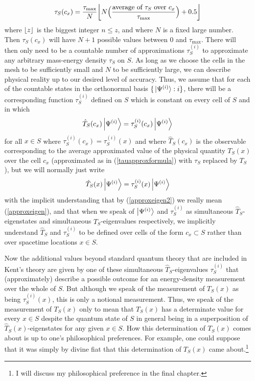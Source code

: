     \begin{equation}\label{tauapproxformula}
    \tau_S(c_x)=\frac{\tau_{\text{max}}}{N}\floor*{N\Big(\frac{\text{average of }\tau_S\text{ over }c_x}{\tau_{\text{max}}}\Big)+0.5}
    \end{equation}
    where $\floor*{z}$ is the biggest integer $n\leq z$, and where $N$ is a fixed large number. Then $\tau_S(c_x)$ will have $N+1$ possible values between $0$ and $\tau_{\text{max}}$.  There will then only need to be a countable number of approximations $\tau_S^{(i)}$ to approximate any arbitrary mass-energy density $\tau_S$ on $S$.  As long as we choose the cells in the mesh to be sufficiently small and $N$ to be sufficiently large, we can describe physical reality up to our desired level of accuracy. Thus, we assume that for each of the countable states in the orthonormal basis $\{\ket*{\Psi^{(i)}}:i\}$, there will be a corresponding function $\tau_S^{(i)}$ defined on $S$ which is constant on every cell of $S$ and in which 
\begin{equation}\label{approxeigen}
\hat{T}_S(c_x)\ket{\Psi^{(i)}}= \tau_S^{(i)}(c_x)\ket{\Psi^{(i)}}
\end{equation} 
for all $x\in S$ where $ \tau_S^{(i)}(c_x)= \tau_S^{(i)}(x)$ and where $\hat{T}_S(c_x)$ is the observable corresponding to the average approximated value of the physical quantity $T_S(x)$ over the cell $c_x$ (approximated as in (\ref{tauapproxformula}) with $\tau_S$ replaced by $T_S$), but we will normally just write
\begin{equation}\label{approxeigen2}
  \hat{T}_S(x)\ket{\Psi^{(i)}}= \tau_S^{(i)}(x)\ket{\Psi^{(i)}}
  \end{equation}
with the implicit understanding that by (\ref{approxeigen2}) we really mean (\ref{approxeigen}), and that when we speak of $\ket{\Psi^{(i)}}$ and $\tau_S^{(i)}$ as simultaneous $\hat{T}_S$-eigenstates and simultaneous $\hat{T}_S$-eigenvalues respectively, we implicitly understand $\hat{T}_S$ and $\tau_S^{(i)}$ to be defined over cells of the form $c_x\subset S$ rather than over spacetime locations $x\in S$.

Now the additional values beyond standard quantum theory that are included in Kent's theory are given by one of these simultaneous $\hat{T}_S$-eigenvalues $\tau_S^{(i)}$ that (approximately) describe a possible outcome for an energy-density measurement over the whole of $S$.  But although we speak of the measurement of $T_S(x)$ as being $\tau_S^{(i)}(x)$, this is only a notional measurement. Thus, we speak of the measurement of  $T_S(x)$ only to mean that $T_S(x)$ has a determinate value for every $x\in S$ despite the quantum state of $S$ in general being in a superposition of $\hat{T}_S(x)$-eigenstates for any given $x\in S$. How this determination of $T_S(x)$ comes about is up to one's philosophical preferences. For example, one could suppose that it was simply by divine fiat that this determination  of $T_S(x)$ came about.\footnote{I will discuss my philosophical preference in the final chapter.} 

